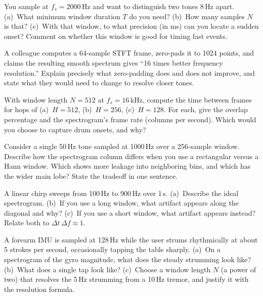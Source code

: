 \begin{exercise}
\label{ch10:ex-resolution}
You sample at $f_s = 2000$\,Hz and want to distinguish two tones 8\,Hz apart.
(a)~What minimum window duration $T$ do you need? (b)~How many samples $N$ is
that? (c)~With that window, to what precision (in ms) can you locate a sudden
onset? Comment on whether this window is good for timing fast events.
\end{exercise}

\begin{exercise}
\label{ch10:ex-zeropad}
A colleague computes a 64-sample STFT frame, zero-pads it to 1024 points, and
claims the resulting smooth spectrum gives ``16 times better frequency
resolution.'' Explain precisely what zero-padding does and does not improve, and
state what they would need to change to resolve closer tones.
\end{exercise}

\begin{exercise}
\label{ch10:ex-hop}
With window length $N = 512$ at $f_s = 16$\,kHz, compute the time between frames
for hops of (a)~$H = 512$, (b)~$H = 256$, (c)~$H = 128$. For each, give the
overlap percentage and the spectrogram's frame rate (columns per second). Which
would you choose to capture drum onsets, and why?
\end{exercise}

\begin{exercise}
\label{ch10:ex-window-leak}
Consider a single 50\,Hz tone sampled at 1000\,Hz over a 256-sample window.
Describe how the spectrogram column differs when you use a rectangular versus a
Hann window. Which shows more leakage into neighboring bins, and which has the
wider main lobe? State the tradeoff in one sentence.
\end{exercise}

\begin{exercise}
\label{ch10:ex-chirp}
A linear chirp sweeps from 100\,Hz to 900\,Hz over 1\,s. (a)~Describe the ideal
spectrogram. (b)~If you use a long window, what artifact appears along the
diagonal and why? (c)~If you use a short window, what artifact appears
instead? Relate both to $\Delta t\,\Delta f \approx 1$.
\end{exercise}

\begin{exercise}
\label{ch10:ex-imu}
A forearm IMU is sampled at 128\,Hz while the user strums rhythmically at about
5 strokes per second, occasionally tapping the table sharply. (a)~On a
spectrogram of the gyro magnitude, what does the steady strumming look like?
(b)~What does a single tap look like? (c)~Choose a window length $N$ (a power of
two) that resolves the 5\,Hz strumming from a 10\,Hz tremor, and justify it with
the resolution formula.
\end{exercise}

